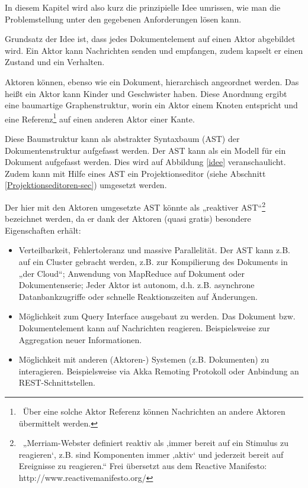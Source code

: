  
In diesem Kapitel wird also kurz die prinzipielle Idee umrissen, wie man die Problemstellung unter den gegebenen Anforderungen lösen kann.

 
Grundsatz der Idee ist, dass jedes Dokumentelement auf einen Aktor abgebildet wird. Ein Aktor kann Nachrichten senden und empfangen, zudem kapselt er einen Zustand und ein Verhalten.

 
Aktoren können, ebenso wie ein Dokument, hierarchisch angeordnet werden. Das heißt ein Aktor kann Kinder und Geschwister haben. Diese Anordnung ergibt eine baumartige Graphenstruktur, worin ein Aktor einem Knoten entspricht und eine Referenz\footnote{~Über eine solche Aktor Referenz können Nachrichten an andere Aktoren übermittelt werden.} auf einen anderen Aktor einer Kante.

 
Diese Baumstruktur kann als abstrakter Syntaxbaum (AST) der Dokumentenstruktur aufgefasst werden. Der AST kann als ein Modell für ein Dokument aufgefasst werden. Dies wird auf Abbildung \ref{idee} veranschaulicht. Zudem kann mit Hilfe eines AST ein Projektionseditor (siehe Abschnitt \ref{Projektionseditoren-sec}) umgesetzt werden.

 
Der hier mit den Aktoren umgesetzte AST könnte als „reaktiver AST“\footnote{~„Merriam-Webster definiert reaktiv als ‚immer bereit auf ein Stimulus zu reagieren‘, z.B. sind Komponenten immer ‚aktiv‘ und jederzeit bereit auf Ereignisse zu reagieren.“ Frei übersetzt aus dem Reactive Manifesto: http://www.reactivemanifesto.org/} bezeichnet werden, da er dank der Aktoren (quasi gratis) besondere Eigenschaften erhält:

 
\begin{itemize}

\item Verteilbarkeit, Fehlertoleranz und massive Parallelität. Der AST kann z.B. auf ein Cluster gebracht werden, z.B. zur Kompilierung des Dokuments in „der Cloud“; Anwendung von MapReduce auf Dokument oder Dokumentenserie; Jeder Aktor ist autonom, d.h. z.B. asynchrone Datanbankzugriffe oder schnelle Reaktionszeiten auf Änderungen.
\item Möglichkeit zum Query Interface ausgebaut zu werden. Das Dokument bzw. Dokumentelement kann auf Nachrichten reagieren. Beispielsweise zur Aggregation neuer Informationen.
\item Möglichkeit mit anderen (Aktoren-) Systemen (z.B. Dokumenten) zu interagieren. Beispielsweise via Akka Remoting Protokoll oder Anbindung an REST-Schnittstellen.
\end{itemize}
 

